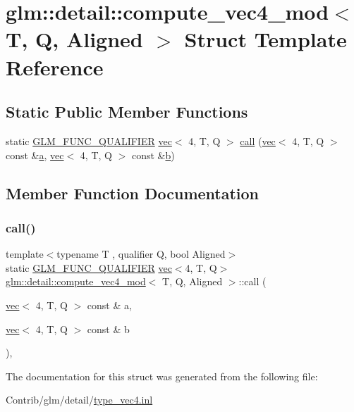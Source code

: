 \hypertarget{structglm_1_1detail_1_1compute__vec4__mod}{}\section{glm\+:\+:detail\+:\+:compute\+\_\+vec4\+\_\+mod$<$ T, Q, Aligned $>$ Struct Template Reference}
\label{structglm_1_1detail_1_1compute__vec4__mod}
\subsection*{Static Public Member Functions}
\begin{DoxyCompactItemize}
\item 
static \mbox{\hyperlink{setup_8hpp_a33fdea6f91c5f834105f7415e2a64407}{G\+L\+M\+\_\+\+F\+U\+N\+C\+\_\+\+Q\+U\+A\+L\+I\+F\+I\+ER}} \mbox{\hyperlink{structglm_1_1vec}{vec}}$<$ 4, T, Q $>$ \mbox{\hyperlink{structglm_1_1detail_1_1compute__vec4__mod_a6076b5feebb458520ea9b393a8e822c1}{call}} (\mbox{\hyperlink{structglm_1_1vec}{vec}}$<$ 4, T, Q $>$ const \&\mbox{\hyperlink{_s_d_l__opengl__glext_8h_a3309789fc188587d666cda5ece79cf82}{a}}, \mbox{\hyperlink{structglm_1_1vec}{vec}}$<$ 4, T, Q $>$ const \&\mbox{\hyperlink{_s_d_l__opengl__glext_8h_a0f71581a41fd2264c8944126dabbd010}{b}})
\end{DoxyCompactItemize}


\subsection{Member Function Documentation}
\mbox{\label{structglm_1_1detail_1_1compute__vec4__mod_a6076b5feebb458520ea9b393a8e822c1}} 
\subsubsection{\texorpdfstring{call()}{call()}}
{\footnotesize\ttfamily template$<$typename T , qualifier Q, bool Aligned$>$ \\
static \mbox{\hyperlink{setup_8hpp_a33fdea6f91c5f834105f7415e2a64407}{G\+L\+M\+\_\+\+F\+U\+N\+C\+\_\+\+Q\+U\+A\+L\+I\+F\+I\+ER}} \mbox{\hyperlink{structglm_1_1vec}{vec}}$<$4, T, Q$>$ \mbox{\hyperlink{structglm_1_1detail_1_1compute__vec4__mod}{glm\+::detail\+::compute\+\_\+vec4\+\_\+mod}}$<$ T, Q, Aligned $>$\+::call (\begin{DoxyParamCaption}\item[{\mbox{\hyperlink{structglm_1_1vec}{vec}}$<$ 4, T, Q $>$ const \&}]{a,  }\item[{\mbox{\hyperlink{structglm_1_1vec}{vec}}$<$ 4, T, Q $>$ const \&}]{b }\end{DoxyParamCaption})\hspace{0.3cm}{\ttfamily [inline]}, {\ttfamily [static]}}



The documentation for this struct was generated from the following file\+:\begin{DoxyCompactItemize}
\item 
Contrib/glm/detail/\mbox{\hyperlink{type__vec4_8inl}{type\+\_\+vec4.\+inl}}\end{DoxyCompactItemize}
